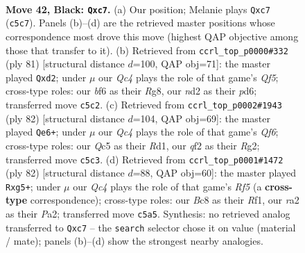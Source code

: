 \documentclass[11pt]{article}
\begin{document}
\clearpage

\begin{figure}[p]\centering
\begin{subfigure}{0.46\textwidth}\centering
\resizebox{\linewidth}{!}{%
\newchessgame
\chessboard[
  setfen={1rb2r2/p1N2p1k/1p3Bp1/2qB4/7P/1P6/R1PN1Q2/R5K1 b - - 0 42},
  showmover=false,
  pgfstyle=straightmove, color=movearrow, markmove={c5-c7}
]}
\caption{}
\end{subfigure}\hfill
\begin{subfigure}{0.46\textwidth}\centering
\resizebox{\linewidth}{!}{%
\newchessgame
\chessboard[
  setfen={6rk/1p6/p2P1pr1/P3p3/5q1p/1R3B1b/3Q1RP1/7K b - - 0 41},
  showmover=false,
  pgfstyle=straightmove, color=movearrow, markmove={f4-d2}
]}
\caption{}
\end{subfigure}
\\[4pt]
\begin{subfigure}{0.46\textwidth}\centering
\resizebox{\linewidth}{!}{%
\newchessgame
\chessboard[
  setfen={2r3kr/2q5/p1b2Q2/1p2p1P1/1P1b1B2/P7/2P3RP/3R3K w - - 11 42},
  showmover=false,
  pgfstyle=straightmove, color=movearrow, markmove={f6-e6}
]}
\caption{}
\end{subfigure}\hfill
\begin{subfigure}{0.46\textwidth}\centering
\resizebox{\linewidth}{!}{%
\newchessgame
\chessboard[
  setfen={3r2k1/1p2q2p/2p5/2b1PRr1/1pP4Q/3p2P1/P6P/5R1K w - - 0 42},
  showmover=false,
  pgfstyle=straightmove, color=movearrow, markmove={f5-g5}
]}
\caption{}
\end{subfigure}
\caption{\textbf{Move 42, Black: \texttt{Qxc7}.} (a) Our position; Melanie plays \texttt{Qxc7} (\texttt{c5c7}). Panels (b)--(d) are the retrieved master positions whose correspondence most drove this move (highest QAP objective among those that transfer to it). (b) Retrieved from \texttt{ccrl\_top\_p0000\#332} (ply 81) [structural distance $d$=100, QAP obj=71]: the master played \texttt{Qxd2}; under $\mu$ our \emph{Qc4} plays the role of that game's \emph{Qf5}; cross-type roles: our \emph{b}f6 as their \emph{R}g8, our \emph{n}d2 as their \emph{p}d6; transferred move \texttt{c5c2}. (c) Retrieved from \texttt{ccrl\_top\_p0002\#1943} (ply 82) [structural distance $d$=104, QAP obj=69]: the master played \texttt{Qe6+}; under $\mu$ our \emph{Qc4} plays the role of that game's \emph{Qf6}; cross-type roles: our \emph{Q}c5 as their \emph{R}d1, our \emph{q}f2 as their \emph{R}g2; transferred move \texttt{c5c3}. (d) Retrieved from \texttt{ccrl\_top\_p0001\#1472} (ply 82) [structural distance $d$=88, QAP obj=60]: the master played \texttt{Rxg5+}; under $\mu$ our \emph{Qc4} plays the role of that game's \emph{Rf5} (a \textbf{cross-type} correspondence); cross-type roles: our \emph{B}c8 as their \emph{R}f1, our \emph{r}a2 as their \emph{P}a2; transferred move \texttt{c5a5}. Synthesis: no retrieved analog transferred to \texttt{Qxc7} -- the \texttt{search} selector chose it on value (material / mate); panels (b)--(d) show the strongest nearby analogies.}
\label{fig:thought-m83}
\end{figure}
\end{document}
